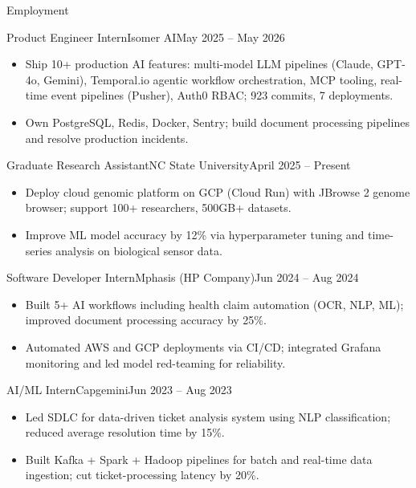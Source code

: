 \documentclass[]{mcdowellcv}
\begin{document}
\makeheader

\begin{cvsection}{Employment}
  \begin{cvsubsection}{Product Engineer Intern}{Isomer AI}{May 2025 -- May 2026}
    \begin{itemize}
      \item Ship 10+ production AI features: multi-model LLM pipelines (Claude, GPT-4o, Gemini), Temporal.io agentic workflow orchestration, MCP tooling, real-time event pipelines (Pusher), Auth0 RBAC; 923 commits, 7 deployments.
      \item Own PostgreSQL, Redis, Docker, Sentry; build document processing pipelines and resolve production incidents.
    \end{itemize}
    \vspace{-1.5pt}
  \end{cvsubsection}

  \begin{cvsubsection}{Graduate Research Assistant}{NC State University}{April 2025 -- Present}
    \begin{itemize}
      \item Deploy cloud genomic platform on GCP (Cloud Run) with JBrowse 2 genome browser; support 100+ researchers, 500GB+ datasets.
      \item Improve ML model accuracy by 12\% via hyperparameter tuning and time-series analysis on biological sensor data.
    \end{itemize}
    \vspace{-1.5pt}
  \end{cvsubsection}

  \begin{cvsubsection}{Software Developer Intern}{Mphasis (HP Company)}{Jun 2024 -- Aug 2024}
    \begin{itemize}
      \item Built 5+ AI workflows including health claim automation (OCR, NLP, ML); improved document processing accuracy by 25\%.
      \item Automated AWS and GCP deployments via CI/CD; integrated Grafana monitoring and led model red-teaming for reliability.
    \end{itemize}
    \vspace{-1.5pt}
  \end{cvsubsection}

  \begin{cvsubsection}{AI/ML Intern}{Capgemini}{Jun 2023 -- Aug 2023}
    \begin{itemize}
      \item Led SDLC for data-driven ticket analysis system using NLP classification; reduced average resolution time by 15\%.
      \item Built Kafka + Spark + Hadoop pipelines for batch and real-time data ingestion; cut ticket-processing latency by 20\%.
    \end{itemize}
    \vspace{-1.5pt}
  \end{cvsubsection}
\end{cvsection}
\end{document}
